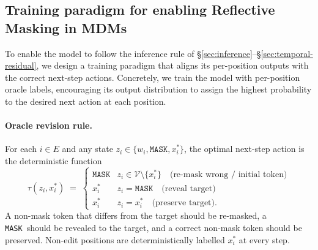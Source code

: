 \documentclass{llmxive}
\providecommand{\methodfull}{Reflective Masking\xspace}
\providecommand{\xstar}{x^{\ast}}
\providecommand{\mask}{\texttt{MASK}}
\begin{document}
\subsection{Training paradigm for enabling \methodfull in MDMs}
\label{sec:training}

To enable the model to follow the inference rule of \S\ref{sec:inference}--\S\ref{sec:temporal-residual}, we design a training paradigm that aligns its per-position outputs with the correct next-step actions. Concretely, we train the model with per-position oracle labels, encouraging its output distribution to assign the highest probability to the desired next action at each position.

\paragraph{Oracle revision rule.}
For each $i \in E$ and any state $z_i \in \{w_i, \mask, \xstar_i\}$, the optimal next-step action is the deterministic function
\begin{equation}
\tau(z_i, \xstar_i) \;=\; \begin{cases}
\mask & z_i \in \mathcal{V} \setminus \{\xstar_i\} \quad \text{(re-mask wrong / initial token)} \\
\xstar_i & z_i = \mask \quad \text{(reveal target)} \\
\xstar_i & z_i = \xstar_i \quad \text{(preserve target).}
\end{cases}
\label{eq:oracle-tau-method}
\end{equation}
A non-mask token that differs from the target should be re-masked, a \mask\ should be revealed to the target, and a correct non-mask token should be preserved. Non-edit positions are deterministically labelled $\xstar_i$ at every step.
\end{document}
